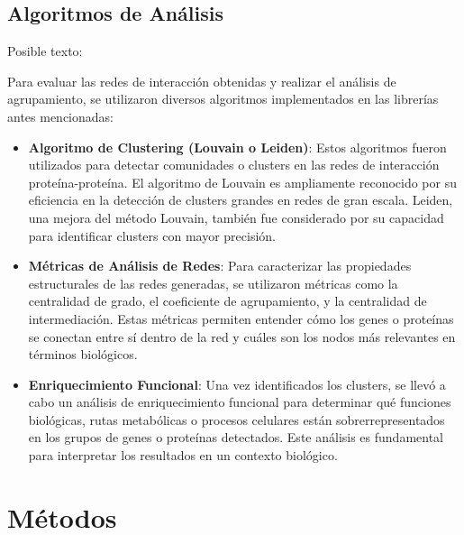 \subsection{Algoritmos de Análisis}

Posible texto:

Para evaluar las redes de interacción obtenidas y realizar el análisis de agrupamiento, se utilizaron diversos algoritmos implementados en las librerías antes mencionadas:

\begin{itemize}
	\item \textbf{Algoritmo de Clustering (Louvain o Leiden)}: Estos algoritmos fueron utilizados para detectar comunidades o clusters en las redes de interacción proteína-proteína. El algoritmo de Louvain es ampliamente reconocido por su eficiencia en la detección de clusters grandes en redes de gran escala. Leiden, una mejora del método Louvain, también fue considerado por su capacidad para identificar clusters con mayor precisión.
	
	\item \textbf{Métricas de Análisis de Redes}: Para caracterizar las propiedades estructurales de las redes generadas, se utilizaron métricas como la centralidad de grado, el coeficiente de agrupamiento, y la centralidad de intermediación. Estas métricas permiten entender cómo los genes o proteínas se conectan entre sí dentro de la red y cuáles son los nodos más relevantes en términos biológicos.
	
	\item \textbf{Enriquecimiento Funcional}: Una vez identificados los clusters, se llevó a cabo un análisis de enriquecimiento funcional para determinar qué funciones biológicas, rutas metabólicas o procesos celulares están sobrerrepresentados en los grupos de genes o proteínas detectados. Este análisis es fundamental para interpretar los resultados en un contexto biológico.
\end{itemize}


\section{Métodos}